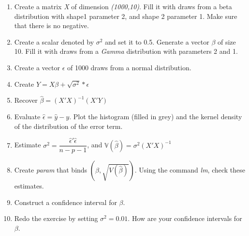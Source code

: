 \documentclass[11pt,a4paper]{article}
\newcommand{\1}{\mathbb{1}}
\newcommand{\V}{\mathbb{V}}
\begin{document}
\begin{Exercise}[title = OLS]
\begin{enumerate}
\item Create a matrix \emph{X} of dimension \emph{(1000,10)}. Fill it with draws from a beta distribution with shape1 parameter 2, and shape 2 parameter 1. Make sure that there is no negative. 
\item Create a scalar denoted by $\sigma^2$ and set it to 0.5. Generate a vector $\beta$ of size 10. Fill it with draws from a \emph{Gamma} distribution with parameters 2 and 1. 
\item Create a vector $\epsilon$ of 1000 draws from a normal distribution. 
\item Create $Y=  X\beta + \sqrt{\sigma^2} *\epsilon$
\item Recover $\hat{\beta} = (X'X)^{-1}(X'Y)$
\item Evaluate $\widehat{\epsilon} = \widehat{y}-y$. Plot the histogram (filled in grey) and the kernel density of the distribution of the error term. 
\item Estimate $\sigma^2 = \dfrac{\widehat{\epsilon}'\widehat{\epsilon}}{n-p-1}$, and $\V(\widehat{\beta})= \sigma^2 (X'X)^{-1}$
\item Create \emph{param} that binds $(\beta,\sqrt{V(\widehat{\beta})})$. Using the command \emph{lm}, check these estimates.  
\item Construct a confidence interval for $\beta$. 
\item Redo the exercise by setting $\sigma^2=0.01$. How are your confidence intervals for $\beta$. 
\end{enumerate}
\end{Exercise}

\end{document}
